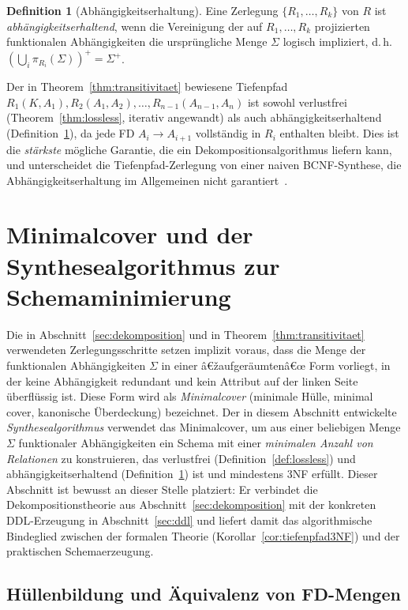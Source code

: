 ﻿\documentclass[a4paper,12pt]{report}
\theoremstyle{definition}
\newtheorem{definition}{Definition}[chapter]
\theoremstyle{remark}
\begin{document}
\begin{definition}[Abhängigkeitserhaltung]
\label{def:dep-erhaltend}
Eine Zerlegung $\{R_1,\ldots,R_k\}$ von $R$ ist
\emph{abhängigkeitserhaltend}, wenn die Vereinigung der auf $R_1,\ldots,
R_k$ projizierten funktionalen Abhängigkeiten die ursprüngliche Menge
$\Sigma$ logisch impliziert, d.\,h.\ $(\bigcup_i \pi_{R_i}(\Sigma))^+ =
\Sigma^+$.
\end{definition}

Der in Theorem~\ref{thm:transitivitaet} bewiesene Tiefenpfad
$R_1(K,A_1), R_2(A_1,A_2),\ldots,R_{n-1}(A_{n-1},A_n)$ ist sowohl
verlustfrei (Theorem~\ref{thm:lossless}, iterativ angewandt) als auch
abhängigkeitserhaltend (Definition~\ref{def:dep-erhaltend}), da jede FD
$A_i \to A_{i+1}$ vollständig in $R_i$ enthalten bleibt. Dies ist die
\emph{stärkste} mögliche Garantie, die ein Dekompositionsalgorithmus
liefern kann, und unterscheidet die Tiefenpfad-Zerlegung von einer
naiven BCNF-Synthese, die Abhängigkeitserhaltung im Allgemeinen nicht
garantiert~\cite{Ullman1988}.

\section{Minimalcover und der Synthesealgorithmus zur Schemaminimierung}
\label{sec:minimalcover}

Die in Abschnitt~\ref{sec:dekomposition} und in
Theorem~\ref{thm:transitivitaet} verwendeten Zerlegungsschritte setzen
implizit voraus, dass die Menge der funktionalen Abhängigkeiten
$\Sigma$ in einer â€žaufgeräumtenâ€œ Form vorliegt, in der keine
Abhängigkeit redundant und kein Attribut auf der linken Seite
überflüssig ist. Diese Form wird als \emph{Minimalcover}
(minimale Hülle, minimal cover, kanonische Überdeckung) bezeichnet.
Der in diesem Abschnitt entwickelte \emph{Synthesealgorithmus}
verwendet das Minimalcover, um aus einer beliebigen Menge $\Sigma$
funktionaler Abhängigkeiten ein Schema mit einer
\emph{minimalen Anzahl von Relationen} zu konstruieren, das
verlustfrei (Definition~\ref{def:lossless}) und
abhängigkeitserhaltend (Definition~\ref{def:dep-erhaltend}) ist und
mindestens 3NF erfüllt. Dieser Abschnitt ist bewusst an dieser Stelle
platziert: Er verbindet die Dekompositionstheorie aus
Abschnitt~\ref{sec:dekomposition} mit der konkreten DDL-Erzeugung in
Abschnitt~\ref{sec:ddl} und liefert damit das algorithmische Bindeglied
zwischen der formalen Theorie (Korollar~\ref{cor:tiefenpfad3NF}) und
der praktischen Schemaerzeugung.

\subsection{Hüllenbildung und Äquivalenz von FD-Mengen}
\end{document}
